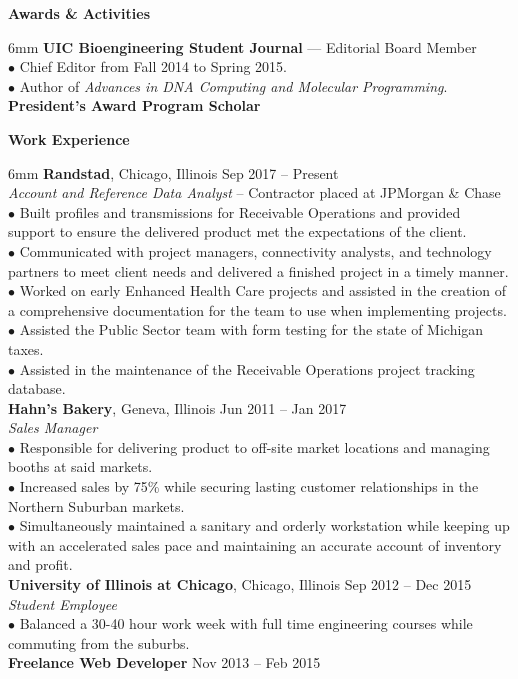 \documentclass[11pt]{article}
\newcommand{\sectionheader}[1]{\noindent \textbf{\large #1}}
\newenvironment{sectionbody}{\begin{adjustwidth}{6mm}{}}{\end{adjustwidth}}
\begin{document}
\vspace{2mm}

\sectionheader{Awards \& Activities}
\begin{sectionbody}
{\bf UIC Bioengineering Student Journal} --- Editorial Board Member \\
$\bullet$ Chief Editor from Fall 2014 to Spring 2015. \\
$\bullet$ Author of {\it Advances in DNA Computing and Molecular Programming}. \\
{\bf President's Award Program Scholar}
\end{sectionbody}

\vspace{2mm}

\sectionheader{Work Experience}
\begin{sectionbody}
{\bf Randstad}, Chicago, Illinois \hfill Sep 2017 -- Present \\
    \textit{Account and Reference Data Analyst} -- Contractor placed at JPMorgan \& Chase \\
$\bullet$ Built profiles and transmissions for Receivable Operations and provided support to ensure the delivered product met the expectations of the client. \\
$\bullet$ Communicated with project managers, connectivity analysts, and technology partners to meet client needs and delivered a finished project in a timely manner. \\
$\bullet$ Worked on early Enhanced Health Care projects and assisted in the creation of a comprehensive documentation for the team to use when implementing projects. \\
$\bullet$ Assisted the Public Sector team with form testing for the state of Michigan taxes. \\
$\bullet$ Assisted in the maintenance of the Receivable Operations project tracking database. \\
{\bf Hahn's Bakery}, Geneva, Illinois \hfill Jun 2011 -- Jan 2017 \\
\textit{Sales Manager} \\
$\bullet$ Responsible for delivering product to off-site market locations and managing booths at said markets. \\
$\bullet$ Increased sales by 75\% while securing lasting customer relationships in the Northern Suburban markets. \\
$\bullet$ Simultaneously maintained a sanitary and orderly workstation while keeping up with an accelerated sales pace and maintaining an accurate account of inventory and profit. \\
{\bf University of Illinois at Chicago}, Chicago, Illinois \hfill Sep 2012 -- Dec 2015 \\
\textit{Student Employee} \\
$\bullet$ Balanced a 30-40 hour work week with full time engineering courses while commuting from the suburbs. \\
{\bf Freelance Web Developer} \hfill Nov 2013 -- Feb 2015
\end{sectionbody}
\end{document}

